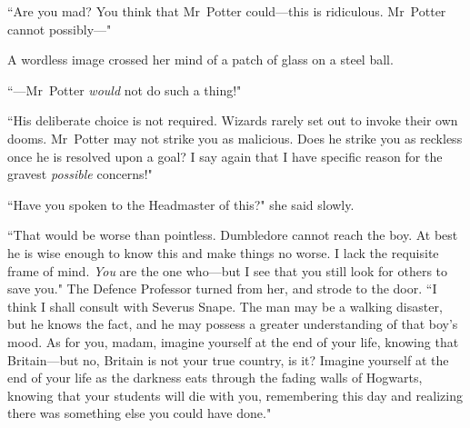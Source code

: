 ``Are you mad? You think that Mr~Potter could—this is ridiculous. Mr~Potter cannot possibly—"

A wordless image crossed her mind of a patch of glass on a steel ball.

``—Mr~Potter \emph{would} not do such a thing!"

``His deliberate choice is not required. Wizards rarely set out to invoke their own dooms. Mr~Potter may not strike you as malicious. Does he strike you as reckless once he is resolved upon a goal? I say again that I have specific reason for the gravest \emph{possible} concerns!"

``Have you spoken to the Headmaster of this?" she said slowly.

``That would be worse than pointless. Dumbledore cannot reach the boy. At best he is wise enough to know this and make things no worse. I lack the requisite frame of mind. \emph{You} are the one who—but I see that you still look for others to save you." The Defence Professor turned from her, and strode to the door. ``I think I shall consult with Severus Snape. The man may be a walking disaster, but he knows the fact, and he may possess a greater understanding of that boy's mood. As for you, madam, imagine yourself at the end of your life, knowing that Britain—but no, Britain is not your true country, is it? Imagine yourself at the end of your life as the darkness eats through the fading walls of Hogwarts, knowing that your students will die with you, remembering this day and realizing there was something else you could have done."

